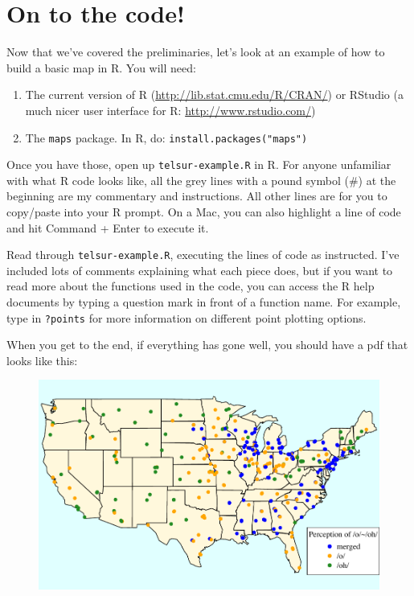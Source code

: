 \documentclass[12pt]{article}
\begin{document}
\section{On to the code!}
Now that we've covered the preliminaries, let's look at an example of how to build a basic map in R. You will need:
\begin{enumerate}
\item The current version of R (\url{http://lib.stat.cmu.edu/R/CRAN/}) or RStudio (a much nicer user interface for R: \url{http://www.rstudio.com/})
\item The \texttt{maps} package. In R, do: \texttt{install.packages("maps")}
\end{enumerate}

Once you have those, open up \texttt{telsur-example.R} in R. For anyone unfamiliar with what R code looks like, all the grey lines with a pound symbol (\#) at the beginning are my commentary and instructions. All other lines are for you to copy/paste into your R prompt. On a Mac, you can also highlight a line of code and hit Command + Enter to execute it. 

Read through \texttt{telsur-example.R}, executing the lines of code as instructed. I've included lots of comments explaining what each piece does, but if you want to read more about the functions used in the code, you can access the R help documents by typing a question mark in front of a function name. For example, type in \texttt{?points} for more information on different point plotting options.

When you get to the end, if everything has gone well, you should have a pdf that looks like this:
\begin{figure}[h]
\includegraphics[width=\linewidth]{telsur-example.pdf}
\end{figure}
\end{document}
